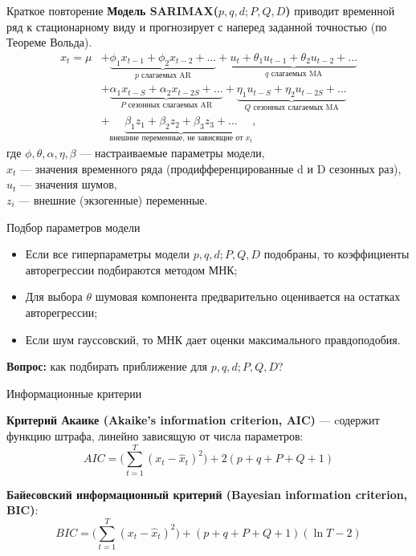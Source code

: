 \begin{frame}{Краткое повторение}
\textbf{Модель SARIMAX($p, q, d; P, Q, D$)} приводит временной ряд к стационарному виду и прогнозирует с наперед заданной точностью (по Теореме Вольда).
\begin{equation*}
    \begin{aligned}
    x_t = \mu &
    + \underbrace{\phi_1 x_{t-1} + \phi_2 x_{t-2} + ...}_{p\text{ слагаемых AR}}
    + \underbrace{u_t + \theta_1 u_{t-1} + \theta_2 u_{t-2} + ...}_{q\text{ слагаемых MA}}\\
    &+ \underbrace{\alpha_1 x_{t-S} + \alpha_2 x_{t-2S}+ ...}_{P\text{ сезонных слагаемых AR}}
    + \underbrace{\eta_1 u_{t-S} + \eta_2 u_{t-2S}+ ...}_{Q\text{ сезонных слагаемых MA}}\\
    &+ \underbrace{\beta_1 z_1 + \beta_2 z_2 + \beta_3 z_3+ ...}_{\text{внешние переменные, не зависящие от } x_t},
    \end{aligned}
\end{equation*}
где $\phi, \theta, \alpha, \eta, \beta$ --- настраиваемые параметры модели,\\
$x_t$ --- значения временного ряда (продифференцированные d и D сезонных раз),\\
$u_t$ --- значения шумов,\\
$z_i$ --- внешние (экзогенные) переменные.
\end{frame}
\begin{frame}{Подбор параметров модели}
\begin{itemize}
    \item Если все гиперпараметры модели $p, q, d; P, Q, D$ подобраны, то коэффициенты авторегрессии подбираются методом МНК;
    \item Для выбора $\theta$ шумовая компонента предварительно оценивается на остатках  авторегрессии;
    \item Если шум гауссовский, то МНК дает оценки максимального правдоподобия.
\end{itemize}
\textbf{Вопрос:} как подбирать приближение для $p, q, d; P, Q, D$?
\end{frame}
\begin{frame}{Информационные критерии}

\textbf{Критерий Акаике (Akaike's information criterion, AIC)} --- cодержит функцию штрафа, линейно зависящую от числа параметров:
\begin{equation*}
    AIC = \Bigg(\sum_{t=1}^T (x_t - \hat{x}_t)^2\Bigg) + 2(p+q+P+Q+1) 
\end{equation*}

\textbf{Байесовский информационный критерий (Bayesian information criterion, BIC)}:
\begin{equation*}
    BIC = \Bigg(\sum_{t=1}^T (x_t - \hat{x}_t)^2\Bigg) + (p+q+P+Q+1)(\ln T - 2)
\end{equation*}\end{frame}

